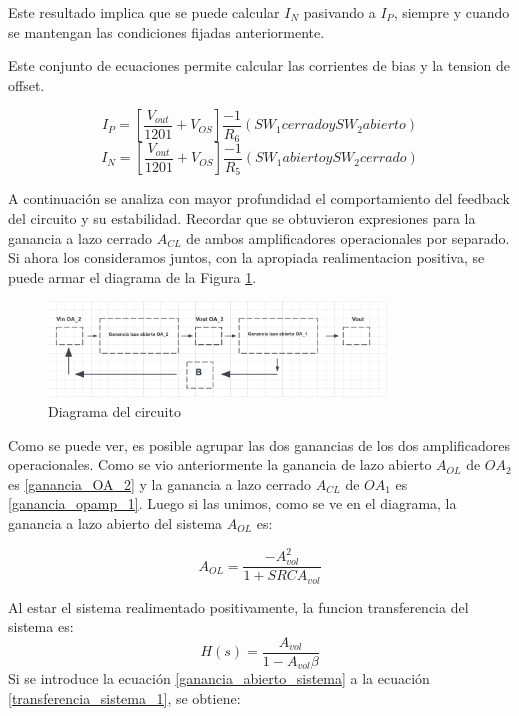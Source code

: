 Este resultado implica que se puede calcular $I_N$ pasivando a $I_P$, siempre y cuando se mantengan las condiciones fijadas anteriormente.

Este conjunto de ecuaciones permite calcular las corrientes de bias y la tension de offset.

\begin{equation} I_{P} = [\frac{V_{out}}{1201} + V_{OS}] \frac{-1}{R_6} (SW_1 cerrado y SW_2 abierto)\label{ecuacion_Ip}\end{equation}
\begin{equation} I_{N} = [\frac{V_{out}}{1201} + V_{OS}] \frac{-1}{R_5} (SW_1 abierto y SW_2 cerrado)\label{ecuacion_In}\end{equation}


A continuación se analiza con mayor profundidad el comportamiento del feedback del circuito y su estabilidad. Recordar que se obtuvieron expresiones para la ganancia a lazo cerrado $A_{CL}$ de ambos amplificadores operacionales 
por separado. Si ahora los consideramos juntos, con la apropiada realimentacion positiva, se puede armar el diagrama de la Figura \ref{diagrama}.

\begin{figure}[h!]                                                       
    \centering\includegraphics[width=0.8\textwidth]{../Ex3/Figuras/diagrama.png}
     \caption{Diagrama del circuito}
     \label{diagrama}
     \end{figure}

Como se puede ver, es posible agrupar las dos ganancias de los dos amplificadores operacionales. Como se vio anteriormente la ganancia de lazo abierto $A_{OL}$ de $OA_2$ es \ref{ganancia_OA_2} y la ganancia a lazo
cerrado $A_{CL}$ de $OA_1$ es \ref{ganancia_opamp_1}. Luego si las unimos, como se ve en el diagrama, la ganancia a lazo abierto del sistema $A_{OL}$ es:

\begin{equation} A_{OL}= \frac{-A_{vol}^2}{1+SRC A_{vol}}  \label{ganancia_abierto_sistema} \end{equation}

Al estar el sistema realimentado positivamente, la funcion transferencia del sistema es:  
\begin{equation} H (s) = \frac{A_{vol}}{1-A_{vol}\beta} \label{transferencia_sistema_1}  \end{equation}
Si se introduce la ecuación \ref{ganancia_abierto_sistema} a la ecuación \ref{transferencia_sistema_1}, se obtiene:


